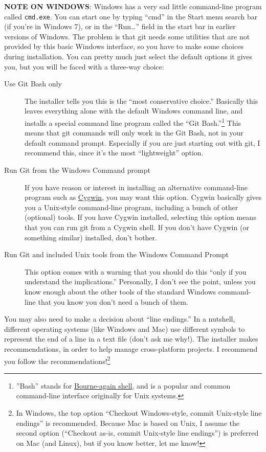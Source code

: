 \documentclass{article}
\begin{document}
\textbf{NOTE ON WINDOWS}: Windows has a very sad little command-line program called \texttt{cmd.exe}. You can start one by typing ``cmd'' in the Start menu search bar (if you're in Windows 7), or in the ``Run\ldots{}'' field in the start bar in earlier versions of Windows. The problem is that git needs some utilities that are not provided by this basic Windows interface, so you have to make some choices during installation. You can pretty much just select the default options it gives you, but you will be faced with a three-way choice:
\begin{description}
\item[Use Git Bash only] The installer tells you this is the ``most conservative choice.'' Basically this leaves everything alone with the default Windows command line, and installs a special command line program called the ``Git Bash.''\footnote{''Bash'' stands for \href{http://en.wikipedia.org/wiki/Bash_(Unix_shell)}{Bourne-again shell}, and is a popular and common command-line interface originally for Unix systems.
 } This means that git commands will only work in the Git Bash, not in your default command prompt.  Especially if you are just starting out with git, I recommend this, since it's the most ``lightweight'' option.
\item[Run Git from the Windows Command prompt] If you have reason or interest in installing an alternative command-line program such as \href{http://www.cygwin.com/}{Cygwin}, you may want this option. Cygwin basically gives you a Unix-style command-line program, including a bunch of other (optional) tools. If you have Cygwin installed, selecting this option means that you can run git from a Cygwin shell.  If you don't have Cygwin (or something similar) installed, don't bother.
\item[Run Git and included Unix tools from the Windows Command Prompt] This option comes with a warning that you should do this ``only if you understand the implications.'' Personally, I don't see the point, unless you know enough about the other tools of the standard Windows command-line that you know you don't need a bunch of them.
\end{description}

You may also need to make a decision about ``line endings.'' In a nutshell, different operating systems (like Windows and Mac) use different symbols to represent the end of a line in a text file (don't ask me why!). The installer makes recommendations, in order to help manage cross-platform projects.  I recommend you follow the recommendations!\footnote{In Windows, the top option ``Checkout Windows-style, commit Unix-style line endings'' is recommended. Because Mac is based on Unix, I assume the second option (``Checkout as-is, commit Unix-style line endings'') is preferred on Mac (and Linux), but if you know better, let me know!
 }
\end{document}

